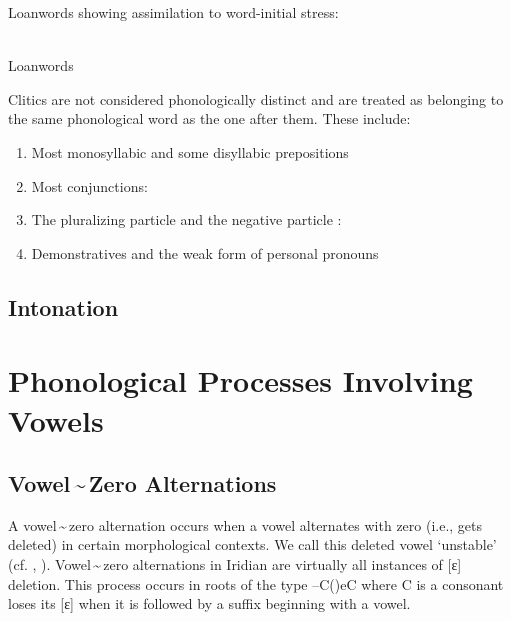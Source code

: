 \pex
\a Loanwords showing assimilation to word-initial stress:\\
\\

\a Loanwords
\xe

Clitics are not considered phonologically distinct and are treated
as belonging to the same phonological word as the one after them. These include:

\begin{enumerate}[noitemsep,label=(\alph*)]
	\item Most monosyllabic and some disyllabic prepositions
	\item Most conjunctions:
	\item The pluralizing particle  and the negative particle
	: 
	\item Demonstratives and the weak form of personal pronouns
\end{enumerate}

\subsection{Intonation}

\section{Phonological Processes Involving Vowels}

\subsection{Vowel\,\sim\,Zero Alternations}

A vowel\,\sim\,zero alternation occurs when a vowel alternates with zero (i.e.,
gets deleted) in certain morphological contexts. We call this deleted vowel
`unstable' (cf. \cite{siptar2000}, \cite{gussmann2007}). Vowel\,\sim\,zero
alternations in Iridian are virtually all instances of [ɛ] deletion. This
process occurs in roots of the type --C()eC where C is a consonant loses
its [ɛ] when it is followed by a suffix beginning with a vowel.

\ex
{}
\xe

